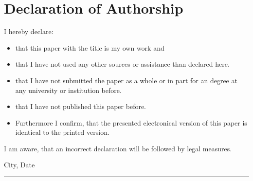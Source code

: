\clearpage
\chapter*{Declaration of Authorship}
\thispagestyle{empty}



I hereby declare:

\begin{itemize}
	\item that this paper with the title \textit{\dertitel} is my own work and
	\item that I have not used any other sources or assistance than declared here.
	\item that I have not submitted the paper as a whole or in part for an degree at any university
		or institution before.
	\item that I have not published this paper before.
	\item Furthermore I confirm, that the presented electronical version of this paper
		is identical to the printed version.
\end{itemize}
I am aware, that an incorrect declaration will be followed by legal measures.

\vspace{3cm}
City, Date
\vspace{3em}

\rule{6cm}{0.4pt}\\
\derautor
